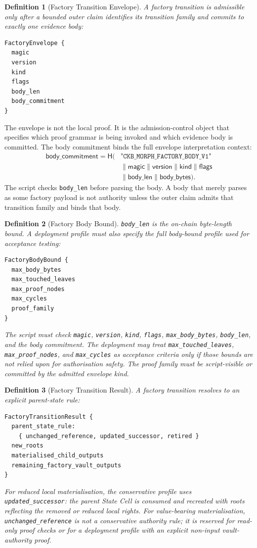 \documentclass[a4paper,11pt]{article}
\newtheorem{definition}{Definition}
\newcommand{\hash}{\mathsf{H}}
\begin{document}
\begin{definition}[Factory Transition Envelope]
A factory transition is admissible only after a bounded outer claim identifies its transition family and commits to exactly one evidence body:
\begin{lstlisting}
FactoryEnvelope {
  magic
  version
  kind
  flags
  body_len
  body_commitment
}
\end{lstlisting}
\end{definition}

The envelope is not the local proof. It is the admission-control object that specifies which proof grammar is being invoked and which evidence body is committed. The body commitment binds the full envelope interpretation context:
\[
\begin{aligned}
\mathsf{body\_commitment}
= \hash(&\texttt{"CKB\_MORPH\_FACTORY\_BODY\_V1"}\\
&\parallel \mathsf{magic}
\parallel \mathsf{version}
\parallel \mathsf{kind}
\parallel \mathsf{flags}\\
&\parallel \mathsf{body\_len}
\parallel \mathsf{body\_bytes}).
\end{aligned}
\]
The script checks \texttt{body\_len} before parsing the body. A body that merely parses as some factory payload is not authority unless the outer claim admits that transition family and binds that body.

\begin{definition}[Factory Body Bound]
\texttt{body\_len} is the on-chain byte-length bound. A deployment profile must
also specify the full body-bound profile used for acceptance testing:
\begin{lstlisting}
FactoryBodyBound {
  max_body_bytes
  max_touched_leaves
  max_proof_nodes
  max_cycles
  proof_family
}
\end{lstlisting}
The script must check \texttt{magic}, \texttt{version}, \texttt{kind},
\texttt{flags}, \texttt{max\_body\_bytes}, \texttt{body\_len}, and the body
commitment. The deployment may treat \texttt{max\_touched\_leaves},
\texttt{max\_proof\_nodes}, and \texttt{max\_cycles} as acceptance criteria
only if those bounds are not relied upon for authorisation safety. The proof
family must be script-visible or committed by the admitted envelope kind.
\end{definition}

\begin{definition}[Factory Transition Result]
A factory transition resolves to an explicit parent-state rule:
\begin{lstlisting}
FactoryTransitionResult {
  parent_state_rule:
    { unchanged_reference, updated_successor, retired }
  new_roots
  materialised_child_outputs
  remaining_factory_vault_outputs
}
\end{lstlisting}
For reduced local materialisation, the conservative profile uses
\texttt{updated\_successor}: the parent State Cell is consumed and recreated
with roots reflecting the removed or reduced local rights.
For value-bearing materialisation, \texttt{unchanged\_reference} is not a
conservative authority rule; it is reserved for read-only proof checks or for a
deployment profile with an explicit non-input vault-authority proof.
\end{definition}
\end{document}
